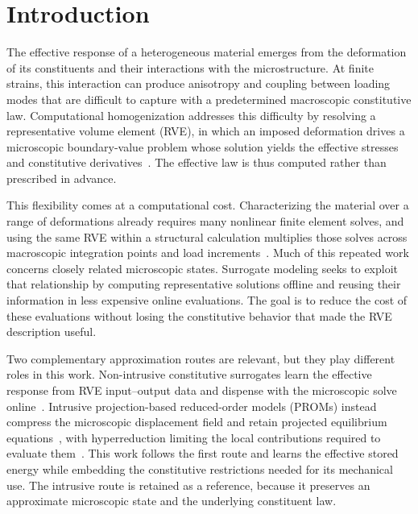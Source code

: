 \section{Introduction}
\label{sec:intro}
The effective response of a heterogeneous material emerges from the deformation of its constituents and their interactions with the microstructure. At finite strains, this interaction can produce anisotropy and coupling between loading modes that are difficult to capture with a predetermined macroscopic constitutive law. Computational homogenization addresses this difficulty by resolving a representative volume element (RVE), in which an imposed deformation drives a microscopic boundary-value problem whose solution yields the effective stresses and constitutive derivatives~\cite{Miehe1999,kouznetsova2001approach,geers2010multi}. The effective law is thus computed rather than prescribed in advance.

This flexibility comes at a computational cost. Characterizing the material over a range of deformations already requires many nonlinear finite element solves, and using the same RVE within a structural calculation multiplies those solves across macroscopic integration points and load increments~\cite{feyel2003multilevel,geers2010multi}. Much of this repeated work concerns closely related microscopic states. Surrogate modeling seeks to exploit that relationship by computing representative solutions offline and reusing their information in less expensive online evaluations. The goal is to reduce the cost of these evaluations without losing the constitutive behavior that made the RVE description useful.

Two complementary approximation routes are relevant, but they play different roles in this work. Non-intrusive constitutive surrogates learn the effective response from RVE input--output data and dispense with the microscopic solve online~\cite{le2015computational}. Intrusive projection-based reduced-order models (PROMs) instead compress the microscopic displacement field and retain projected equilibrium equations~\cite{benner2015survey,yvonnet2007,Hernandez2014}, with hyperreduction limiting the local contributions required to evaluate them~\cite{hernandez2017}. This work follows the first route and learns the effective stored energy while embedding the constitutive restrictions needed for its mechanical use. The intrusive route is retained as a reference, because it preserves an approximate microscopic state and the underlying constituent law.

